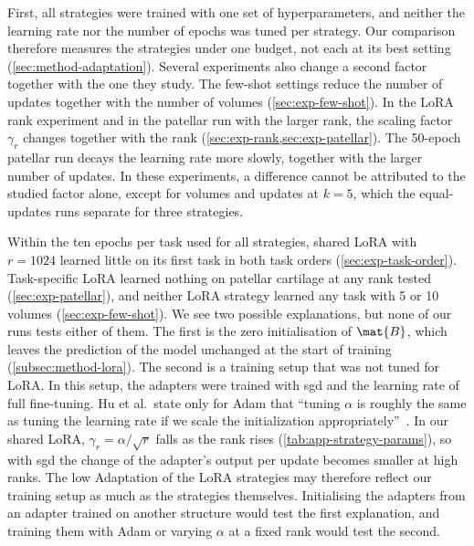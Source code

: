 First, all strategies were trained with one set of hyperparameters, and neither the learning rate nor the number of epochs was tuned per strategy.
Our comparison therefore measures the strategies under one budget, not each at its best setting (\cref{sec:method-adaptation}).
Several experiments also change a second factor together with the one they study.
The few-shot settings reduce the number of updates together with the number of volumes (\cref{sec:exp-few-shot}).
In the LoRA rank experiment and in the patellar run with the larger rank, the scaling factor $\gamma_r$ changes together with the rank (\cref{sec:exp-rank,sec:exp-patellar}).
The 50-epoch patellar run decays the learning rate more slowly, together with the larger number of updates.
In these experiments, a difference cannot be attributed to the studied factor alone, except for volumes and updates at $k = 5$, which the equal-updates runs separate for three strategies.

Within the ten epochs per task used for all strategies, shared LoRA with $r = 1024$ learned little on its first task in both task orders (\cref{sec:exp-task-order}).
Task-specific LoRA learned nothing on patellar cartilage at any rank tested (\cref{sec:exp-patellar}), and neither LoRA strategy learned any task with 5 or 10 volumes (\cref{sec:exp-few-shot}).
We see two possible explanations, but none of our runs tests either of them.
The first is the zero initialisation of $\mat{B}$, which leaves the prediction of the model unchanged at the start of training (\cref{subsec:method-lora}).
The second is a training setup that was not tuned for LoRA.
In this setup, the adapters were trained with \gls{sgd} and the learning rate of full fine-tuning.
Hu et al.\ state only for Adam that ``tuning $\alpha$ is roughly the same as tuning the learning rate if we scale the initialization appropriately''~\cite[Sec.~4.1]{hu2022lora}.
In our shared LoRA, $\gamma_r = \alpha / \sqrt{r}$ falls as the rank rises (\cref{tab:app-strategy-params}), so with \gls{sgd} the change of the adapter's output per update becomes smaller at high ranks.
The low Adaptation of the LoRA strategies may therefore reflect our training setup as much as the strategies themselves.
Initialising the adapters from an adapter trained on another structure would test the first explanation, and training them with Adam or varying $\alpha$ at a fixed rank would test the second.

